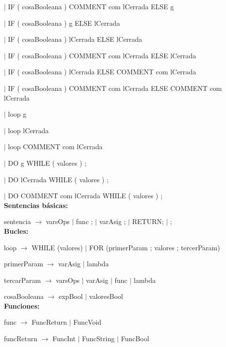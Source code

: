 \hspace{15mm}$|$ IF ( cosaBooleana ) COMMENT com lCerrada ELSE { g } 

\hspace{15mm}$|$ IF ( cosaBooleana ) { g } ELSE lCerrada 

\hspace{15mm}$|$ IF ( cosaBooleana ) lCerrada ELSE lCerrada 

\hspace{15mm}$|$ IF ( cosaBooleana ) COMMENT com lCerrada ELSE lCerrada 

\hspace{15mm}$|$ IF ( cosaBooleana ) lCerrada ELSE  COMMENT com lCerrada 

\hspace{15mm}$|$ IF ( cosaBooleana ) COMMENT com lCerrada ELSE  COMMENT com lCerrada

\hspace{15mm}$|$ loop { g } 

\hspace{15mm}$|$ loop lCerrada 

\hspace{15mm}$|$ loop COMMENT com lCerrada

\hspace{15mm}$|$ DO { g } WHILE ( valores ) ;
  
\hspace{15mm}$|$ DO lCerrada WHILE ( valores ) ;  
  
\hspace{15mm}$|$  DO COMMENT com lCerrada WHILE ( valores ) ; \\


\textbf{Sentencias básicas:}

sentencia $\rightarrow$ varsOps $|$ func ; $|$ varAsig ; $|$ RETURN; $|$ ; \\


\textbf{Bucles:}

loop $\rightarrow$ WHILE (valores) $|$ FOR (primerParam ; valores ; tercerParam)

primerParam $\rightarrow$  varAsig $|$ lambda

tercarParam $\rightarrow$  varsOps $|$ varAsig $|$ func $|$ lambda

cosaBooleana $\rightarrow$ expBool $|$ valoresBool \\
  

\textbf{Funciones:}

func $\rightarrow$ FuncReturn $|$ FuncVoid

funcReturn $\rightarrow$ FuncInt $|$ FuncString $|$ FuncBool

